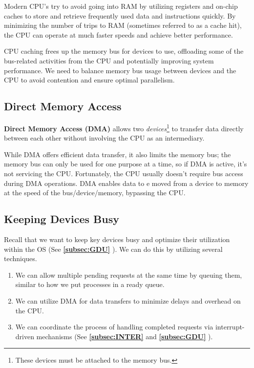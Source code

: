 \documentclass{report}
\newcommand{\definitionBegin}[1]{\begin{tcolorbox}[title={Definition: #1}]}
\newcommand{\definitionEnd}{\end{tcolorbox}}
\newcommand{\asideBegin}[1]{\begin{tcolorbox}[colback=orange!5!white,colframe=black!75!orange,title={Aside:
      #1}]}
\newcommand{\asideEnd}{\end{tcolorbox}}
\newcommand{\refto}[2]{\textbf{\ref{#1:#2} \nameref{#1:#2}}}
\begin{document}
\asideBegin{CPU Caching}
Modern CPU's try to avoid going into RAM by utilizing registers and on-chip caches to store and
retrieve frequently used data and instructions quickly. By minimizing the number of trips to RAM
(sometimes referred to as a cache hit), the CPU can operate at much faster speeds and achieve better
performance.
\asideEnd

CPU caching frees up the memory bus for devices to use, offloading some of the bus-related
activities from the CPU and potentially improving system performance. We need to balance memory bus
usage between devices and the CPU to avoid contention and ensure optimal parallelism.


\subsection{Direct Memory Access}
\definitionBegin{Direct Memory Access}
\textbf{Direct Memory Access (DMA)} allows two \textit{devices}\footnote{These devices must be
  attached to the memory bus.} to transfer data directly between each other without involving the
CPU as an intermediary.
\definitionEnd

While DMA offers efficient data transfer, it also limits the memory bus; the memory bus can only be
used for one purpose at a time, so if DMA is active, it's not servicing the CPU. Fortunately, the
CPU usually doesn't require bus access during DMA operations. DMA enables data to e moved from a
device to memory at the speed of the bus/device/memory, bypassing the CPU. 


\subsection{Keeping Devices Busy}
Recall that we want to keep key devices busy and optimize their utilization within the OS (See
\refto{subsec}{GDU}). We can do this by utilizing several techniques.


\begin{enumerate}[label=\textit{(\roman*)}]
\item We can allow multiple pending requests at the same time by queuing them, similar to how we put
processes in a ready queue.
\item We can utilize DMA for data transfers to minimize delays and overhead on the CPU.
\item We can coordinate the process of handling completed requests via interrupt-driven mechanisms
  (See \refto{subsec}{INTER} and \refto{subsec}{GDU}).
\end{enumerate}
\end{document}
